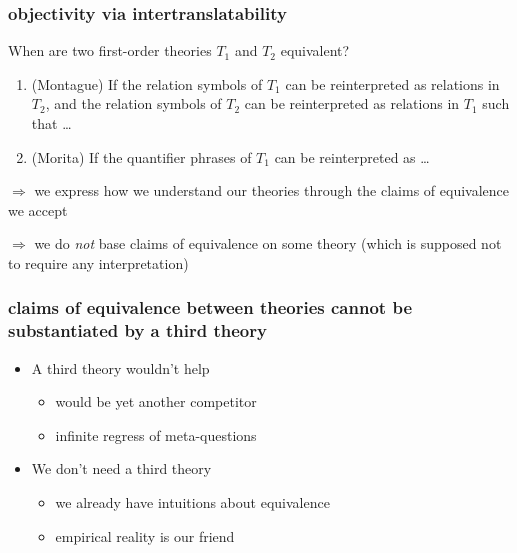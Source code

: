 \documentclass{beamer}
\begin{document}
\begin{frame}
  \frametitle{objectivity via intertranslatability}

  When are two first-order theories $T_1$ and $T_2$ equivalent?

  \begin{enumerate}
  \item (Montague) If the relation symbols of $T_1$ can be reinterpreted as
    relations in $T_2$, and the relation symbols of $T_2$ can be
    reinterpreted as relations in $T_1$ such that \dots
  \item (Morita) If the quantifier phrases of $T_1$ can be
    reinterpreted as \dots
  \end{enumerate}

  \bigskip \bigskip $\Longrightarrow$ we express how we understand our
  theories through the claims of equivalence we accept

  \medskip $\Longrightarrow$ we do \emph{not} base claims of
  equivalence on some theory (which is supposed not to require any
  interpretation)

\end{frame}  

\begin{frame}
  \frametitle{claims of equivalence between theories cannot be
    substantiated by a third theory}

  \begin{itemize}
  \item A third theory wouldn't help
      \begin{itemize}
      \item would be yet another competitor
      \item infinite regress of meta-questions
        \end{itemize}  
      \item We don't need a third theory
        \begin{itemize}
        \item we already have intuitions about equivalence
        \item empirical reality is our friend
        \end{itemize}
  \end{itemize}
  
\end{frame}
\end{document}
